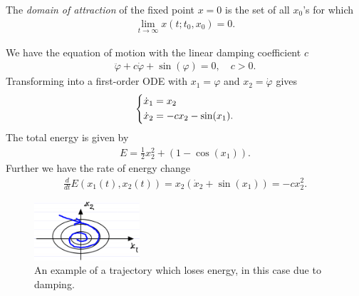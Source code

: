 \begin{definition} 
	The \emph{domain of attraction} of the fixed point $x=0$ is the set of all $ {x}_0$'s for which
	\begin{align}
		\boxed{\lim_{t\to \infty } {x}(t;t_0,  {x}_0)=0. }	
	\end{align}
	
\end{definition}

\begin{ex}
	We have the equation of motion with the linear damping coefficient $c$
	\begin{align}
		\ddot{\varphi} + c \dot{\varphi} + \sin(\varphi) = 0,\quad c>0.
	\end{align}
	Transforming into a first-order ODE with $x_1 = \varphi$ and $x_2 = \dot{\varphi}$ gives
	 \begin{align}
		\begin{dcases}
		\dot{x}_1 = x_2\\ \dot{x}_2 = -cx_2 - \sin(x_1).
		\end{dcases}
	\end{align}
The total energy is given by
\begin{align}
	E = \frac{1}{2}x_2^2 + \left( 1 - \cos(x_1) \right). 
\end{align}
Further we have the rate of energy change
\begin{align}
\frac{d}{dt} E(x_1(t), x_2(t)) = x_2 \left(\dot{x}_2 + \sin(x_1) \right) = -c x_2^{2}.
\end{align}
\begin{figure}[h!]
	\centering
	\includegraphics[width=0.35\textwidth]{figures/ch2/4damped_pendulum.png}
	\caption{An example of a trajectory which loses energy, in this case due to damping.}
	\label{fig:losing_energy_pend}
\end{figure}


\end{ex}
